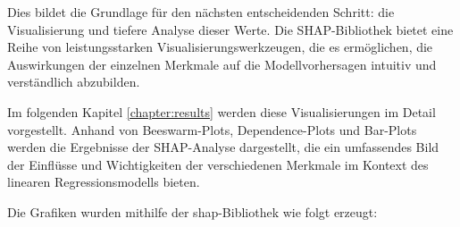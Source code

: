 Dies bildet die Grundlage für den nächsten entscheidenden Schritt: 
die Visualisierung und tiefere Analyse dieser Werte. Die SHAP-Bibliothek bietet eine 
Reihe von leistungsstarken Visualisierungswerkzeugen, die es ermöglichen, die Auswirkungen 
der einzelnen Merkmale auf die Modellvorhersagen intuitiv und verständlich abzubilden. 

Im folgenden Kapitel \ref{chapter:results} werden diese Visualisierungen im Detail vorgestellt. 
Anhand von Beeswarm-Plots, Dependence-Plots und Bar-Plots werden die Ergebnisse der 
SHAP-Analyse dargestellt, die ein umfassendes Bild der Einflüsse und Wichtigkeiten der 
verschiedenen Merkmale im Kontext des linearen Regressionsmodells bieten.

Die Grafiken wurden mithilfe der \textsf{shap}-Bibliothek wie folgt erzeugt:



